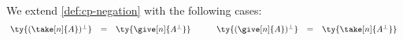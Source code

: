 \begin{definition}[Duality]\label{def:nc-negation}
  We extend \cref{def:cp-negation} with the following cases:
  \[\!
    \begin{array}{lclclcl}
              \ty{(\take[n]{A})^\bot} &=& \ty{\give[n]{A^\bot}}
      &\quad& \ty{(\give[n]{A})^\bot} &=& \ty{\take[n]{A^\bot}}
    \end{array}
  \]
\end{definition}

